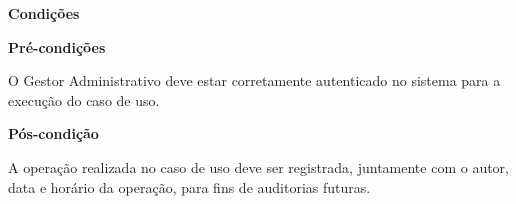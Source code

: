 
	
   {\raggedright
      \textbf{Condições}
   }
   
    
   \textbf{Pré-condições}
   
   O Gestor Administrativo deve estar corretamente autenticado no sistema para a execução do caso de uso.
   
   \textbf{Pós-condição}
   
   A operação realizada no caso de uso deve ser registrada, juntamente com o autor, data e horário da operação, para fins de auditorias futuras.
  
  \vfill
  \pagebreak


   
 
